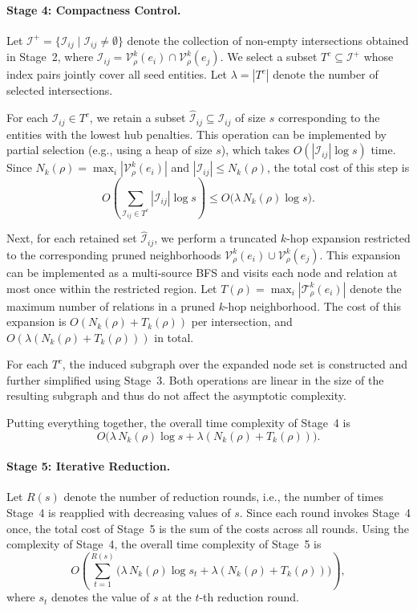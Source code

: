 \paragraph{Stage 4: Compactness Control.}
Let $\mathcal I^+=\{\mathcal I_{ij}\mid \mathcal I_{ij}\neq\emptyset\}$ denote the collection of non-empty intersections obtained in Stage~2,
where $\mathcal I_{ij}=\mathcal V^k_\rho(e_i)\cap\mathcal V^k_\rho(e_j)$.
We select a subset $T^c\subseteq \mathcal I^+$ whose index pairs jointly cover all seed entities.
Let $\lambda=|T^c|$ denote the number of selected intersections.

For each $\mathcal I_{ij}\in T^c$, we retain a subset $\hat{\mathcal I}_{ij}\subseteq\mathcal I_{ij}$ of size $s$
corresponding to the entities with the lowest hub penalties.
This operation can be implemented by partial selection (e.g., using a heap of size $s$),
which takes $O(|\mathcal I_{ij}|\log s)$ time. Since 
$
N_k(\rho)=\max_i |\mathcal V^k_\rho(e_i)|$
and $|\mathcal I_{ij}|\le N_k(\rho)$, the total cost of this step is
\[
O\!\left(\sum_{\mathcal I_{ij}\in T^c} |\mathcal I_{ij}|\log s\right)
\le O\big(\lambda\,N_k(\rho)\log s\big).
\]

Next, for each retained set $\hat{\mathcal I}_{ij}$, we perform a truncated $k$-hop expansion restricted to the corresponding
pruned neighborhoods $\mathcal V^k_\rho(e_i)\cup\mathcal V^k_\rho(e_j)$.
This expansion can be implemented as a multi-source BFS and visits each node and relation at most once within the restricted region.
Let
$
T(\rho)=\max_i |\mathcal T^k_\rho(e_i)|
$
denote the maximum number of relations in a pruned $k$-hop neighborhood.
The cost of this expansion is $O(N_k(\rho)+T_k(\rho))$ per intersection,
and $O(\lambda(N_k(\rho)+T_k(\rho)))$ in total.

For each $T^c$, the induced subgraph over the expanded node set is constructed and further simplified using Stage~3.
Both operations are linear in the size of the resulting subgraph and thus do not affect the asymptotic complexity.

Putting everything together, the overall time complexity of Stage~4 is
\[
O\big(\lambda\,N_k(\rho)\log s + \lambda(N_k(\rho)+T_k(\rho))\big).
\]


\paragraph{Stage 5: Iterative Reduction.}
Let $R (s)$ denote the number of reduction rounds, i.e., the number of times Stage~4 is reapplied with decreasing values of $s$.
Since each round invokes Stage~4 once, the total cost of Stage~5 is the sum of the costs across all rounds.
Using the complexity of Stage~4, the overall time complexity of Stage~5 is
\[
O\!\left(
\sum_{t=1}^{R (s)}
\big(
\lambda\,N_k(\rho)\log s_t
+
\lambda(N_k(\rho)+T_k(\rho))
\big)
\right),
\]
where $s_t$ denotes the value of $s$ at the $t$-th reduction round.

